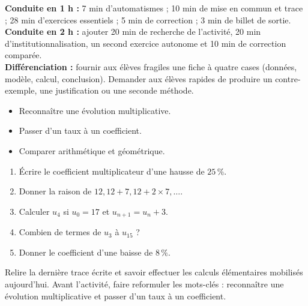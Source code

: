 \ifprof
\begin{methode}
\textbf{Conduite en 1 h :} 7 min d'automatismes ; 10 min de mise en commun et trace ; 28 min d'exercices essentiels ; 5 min de correction ; 3 min de billet de sortie.\\
\textbf{Conduite en 2 h :} ajouter 20 min de recherche de l'activité, 20 min d'institutionnalisation, un second exercice autonome et 10 min de correction comparée.\\
\textbf{Différenciation :} fournir aux élèves fragiles une fiche à quatre cases (données, modèle, calcul, conclusion). Demander aux élèves rapides de produire un contre-exemple, une justification ou une seconde méthode.
\end{methode}
\fi
{}
    \begin{objectifs}\begin{itemize}\item Reconnaître une évolution multiplicative.\item Passer d'un taux à un coefficient.\item Comparer arithmétique et géométrique.\end{itemize}\end{objectifs}
    \begin{automatismes}\begin{enumerate}\item Écrire le coefficient multiplicateur d'une hausse de $25\,\%$. \item Donner la raison de $12,12+7,12+2\times7,\ldots$. \item Calculer $u_4$ si $u_0=17$ et $u_{n+1}=u_n+3$. \item Combien de termes de $u_3$ à $u_{15}$ ? \item Donner le coefficient d'une baisse de $8\,\%$. \end{enumerate}\end{automatismes}
    \begin{prerequis}Relire la dernière trace écrite et savoir effectuer les calculs élémentaires mobilisés aujourd'hui. Avant l'activité, faire reformuler les mots-clés : reconnaître une évolution multiplicative et passer d'un taux à un coefficient.\end{prerequis}

